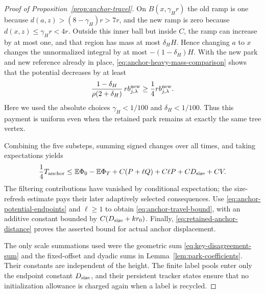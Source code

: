 \begin{proof}[Proof of Proposition~\ref{prop:anchor-travel}]
On $B(x,\gamma_Hr)$ the old ramp is one because
$d(a,z)>(8-\gamma_H)r>7r$, and the new ramp is zero because
$d(x,z)\le\gamma_Hr<4r$.  Outside this inner ball but inside $C$, the
ramp can increase by at most one, and that region has mass at most
$\delta_H H$.  Hence changing $a$ to $x$ changes the unnormalized
integral by at most $-(1-\delta_H)H$.  With the new park and new
reference already in place, \eqref{eq:anchor-heavy-mass-comparison}
shows that the potential decreases by at least
\begin{equation}\label{eq:retained-anchor-drop}
 \frac{1-\delta_H}{\rho(2+\delta_H)}\,r b^{\rm new}_{j,\lambda}
                         \ge\frac14 r b^{\rm new}_{j,\lambda}.
\end{equation}
Here we used the absolute choices $\gamma_H<1/100$ and
$\delta_H<1/100$.  Thus this payment is uniform even when the retained
park remains at exactly the same tree vertex.

Combining the five substeps, summing signed changes over all times, and
taking expectations yields
\[
 \frac14 T_{\rm anchor}
 \le \mathbb E\Phi_0-\mathbb E\Phi_T
       +C(P+\ell Q)+C\ell P+C D_{\rm size}+CV.
\]
The filtering contributions have vanished by conditional expectation;
the size-refresh estimate pays their later adaptively selected
consequences.  Use \eqref{eq:anchor-potential-endpoints} and $\ell\ge1$
to obtain \eqref{eq:anchor-travel-bound}, with an additive constant
bounded by $C(D_{\rm size}+kr_0)$.  Finally,
\eqref{eq:retained-anchor-distance} proves the asserted bound for actual
anchor displacement.

The only scale summations used were the geometric sum
\eqref{eq:key-disagreement-sum} and the fixed-offset and dyadic sums in
Lemma~\ref{lem:park-coefficients}.  Their constants are independent of
the height.  The finite label pools enter only the endpoint constant
$D_{\rm size}$, and their persistent tracker states ensure that no
initialization allowance is charged again when a label is recycled.
\end{proof}
